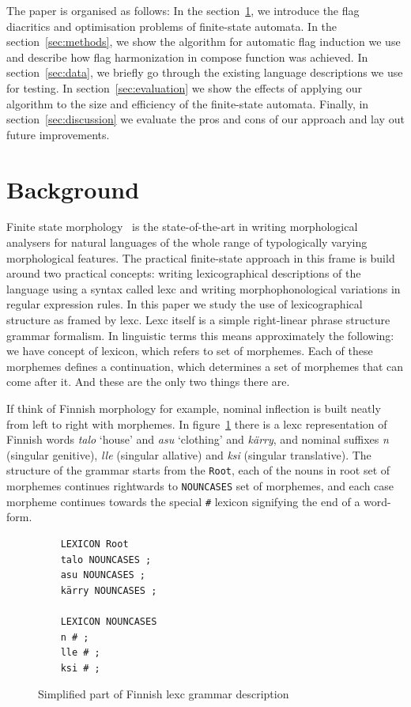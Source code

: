 \documentclass[11pt]{article}
\begin{document}
The paper is organised as follows: In the section~\ref{sec:background}, we
introduce the flag diacritics and optimisation problems of finite-state 
automata. In the section~\ref{sec:methods}, we show the algorithm for automatic
flag induction we use and describe how flag harmonization in compose function was achieved. 
In section~\ref{sec:data}, we briefly go through the existing language
descriptions we use for testing. In 
section~\ref{sec:evaluation} we show the effects of applying our algorithm
to the size and efficiency of the finite-state automata. Finally, in section~\ref{sec:discussion}
we evaluate the pros and cons of our approach and lay out future improvements.

\section{Background}
\label{sec:background}

Finite state morphology~\cite{beesley2003finite} is the state-of-the-art in
writing morphological analysers for natural languages of the whole range of
typologically varying morphological features. The practical finite-state
approach in this frame is build around two practical concepts: writing
lexicographical descriptions of the language using a syntax called lexc and
writing morphophonological variations in regular expression rules. In this
paper we study the use of lexicographical structure as framed by lexc. Lexc
itself is a simple right-linear phrase structure grammar formalism. In
linguistic terms this means approximately the following: we have concept of
lexicon, which refers to set of morphemes. Each of these morphemes defines a
continuation, which determines a set of morphemes that can come after it. And
these are the only two things there are. 

If think of Finnish morphology for example, nominal inflection is built neatly
from left to right with morphemes. In figure~\ref{fig:lexc-fin} there is a 
lexc representation of Finnish words \emph{talo} `house' and \emph{asu}
`clothing' and \emph{kärry}, and nominal suffixes \emph{n} (singular genitive),
\emph{lle} (singular allative) and \emph{ksi} (singular translative). The
structure of the grammar starts from the \texttt{Root}, each of the nouns in
root set of morphemes continues rightwards to \texttt{NOUNCASES} set of 
morphemes, and each case morpheme continues towards the special \texttt{\#}
lexicon signifying the end of a word-form.

\begin{figure}
    \centering
    \begin{verbatim}
    LEXICON Root
    talo NOUNCASES ;
    asu NOUNCASES ;
    kärry NOUNCASES ;

    LEXICON NOUNCASES
    n # ;
    lle # ;
    ksi # ;
    \end{verbatim}
    \caption{Simplified part of Finnish lexc grammar description
    \label{fig:lexc-fin}}
\end{figure}
\end{document}
